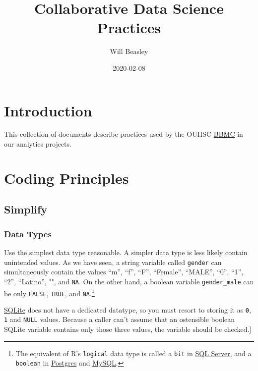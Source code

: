 \documentclass[
]{book}
\title{Collaborative Data Science Practices}
\author{Will Beasley}
\date{2020-02-08}
\begin{document}
\maketitle

{
\setcounter{tocdepth}{1}
\tableofcontents
}
\hypertarget{intro}{%
\chapter{Introduction}\label{intro}}

This collection of documents describe practices used by the OUHSC \href{https://ouhsc.edu/bbmc}{BBMC} in our analytics projects.

\hypertarget{coding}{%
\chapter{Coding Principles}\label{coding}}

\hypertarget{coding-simplify}{%
\section{Simplify}\label{coding-simplify}}

\hypertarget{coding-simplify-types}{%
\subsection{Data Types}\label{coding-simplify-types}}

Use the simplest data type reasonable. A simpler data type is less likely contain unintended values. As we have seen, a string variable called \texttt{gender} can simultaneously contain the values ``m'', ``f'', ``F'', ``Female'', ``MALE'', ``0'', ``1'', ``2'', ``Latino'', "", and \texttt{NA}. On the other hand, a boolean variable \texttt{gender\_male} can be only \texttt{FALSE}, \texttt{TRUE}, and \texttt{NA}.\footnote{The equivalent of R's \texttt{logical} data type is called a \texttt{bit} in \href{https://docs.microsoft.com/en-us/sql/t-sql/data-types/bit-transact-sql}{SQL Server}, and a \texttt{boolean} in \href{https://www.postgresql.org/docs/current/datatype-boolean.html}{Postgres} and \href{https://dev.mysql.com/doc/refman/8.0/en/boolean-literals.html}{MySQL}.}

\href{https://www.sqlite.org/datatype3.html}{SQLite} does not have a dedicated datatype, so you must resort to storing it as \texttt{0}, \texttt{1} and \texttt{NULL} values. Because a caller can't assume that an ostensible boolean SQLite variable contains only those three values, the variable should be checked.{]}
\end{document}
